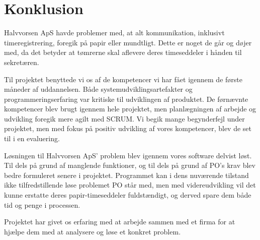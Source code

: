\section{Konklusion}
Halvvorsen ApS havde problemer med, at alt kommunikation, inklusivt timeregistrering, foregik på papir eller mundtligt. 
Dette er noget de går og døjer med, da det betyder at tømrerne skal aflevere deres timeseddeler i hånden til sekretæren.

Til projektet benyttede vi os af de kompetencer vi har fået igennem de første måneder af uddannelsen.
Både systemudviklingsartefakter og programmeringserfaring var kritiske til udviklingen af produktet. 
De førnævnte kompetencer blev brugt igennem hele projektet, men planlægningen af arbejde og udvikling foregik mere agilt med SCRUM.
Vi begik mange begynderfejl under projektet, men med fokus på positiv udvikling af vores kompetencer, blev de set til i en evaluering.
 
Løsningen til Halvvorsen ApS' problem blev igennem vores software delvist løst. 
Til dels på grund af manglende funktioner, og til dels på grund af PO's krav blev bedre formuleret senere i projektet.
Programmet kan i dens nuværende tilstand ikke tilfredstillende løse problemet PO står med, men med videreudvikling vil det kunne erstatte deres papir-timeseddeler fuldstændigt, og derved spare dem både tid og penge i processen.

Projektet har givet os erfaring med at arbejde sammen med et firma for at hjælpe dem med at analysere og løse et konkret problem.